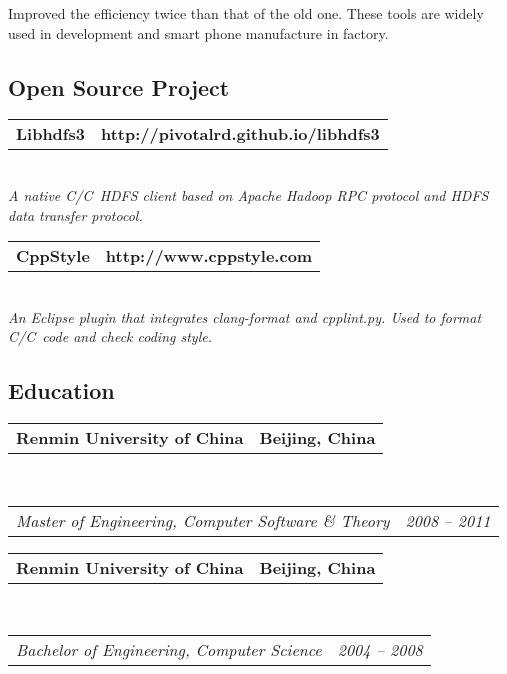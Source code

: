 \documentclass[10pt,letterpaper]{article}
\makeatletter
\newcommand{\headerrow}[2]
{\begin{tabular*}{\linewidth}{l@{\extracolsep{\fill}}r}
	#1 &
	#2 \\
\end{tabular*}}
\newcommand{\CPP}
{C\nolinebreak[4]\hspace{-.05em}\raisebox{.22ex}{\footnotesize\bf ++}}
\makeatother
\begin{document}
\begin{CJK}{UTF8}{gbsn}
\begin{itemize}
\begin{itemize*}
		\item Improved the efficiency twice than that of the old one. These tools are widely used in development and smart phone manufacture in factory. 
	\end{itemize*}
\end{itemize}

\vspace{-8mm}
\subsection*{Open Source Project}
\vspace{-2mm}

\begin{itemize*}
	\parskip=0.2mm

	\item 
	\headerrow
		{\textbf{Libhdfs3}}
		{\textbf{http://pivotalrd.github.io/libhdfs3}}
	\\
	{\emph{A native C/\CPP\  HDFS client based on Apache Hadoop RPC protocol and HDFS data transfer protocol.}}
	
	\item 
	\headerrow
		{\textbf{CppStyle}}
		{\textbf{http://www.cppstyle.com}}
	\\
	{\emph{An Eclipse plugin that integrates clang-format and cpplint.py. Used to format C/\CPP\ code and check coding style.}}

\end{itemize*}

\vspace{-8mm}
\subsection*{Education}
\vspace{-2mm}

\begin{itemize*}
	\parskip=0.2mm

	\item 
	\headerrow
		{\textbf{Renmin University of China}}
		{\textbf{Beijing, China}}
	\\
	\headerrow
		{\emph{Master of Engineering, Computer Software \& Theory}}
		{\emph{2008 -- 2011}}

	\item 
	\headerrow
		{\textbf{Renmin University of China}}
		{\textbf{Beijing, China}}
	\\
	\headerrow
		{\emph{Bachelor of Engineering, Computer Science}}
		{\emph{2004 -- 2008}}


\end{itemize*}
\end{CJK}
\end{document}
